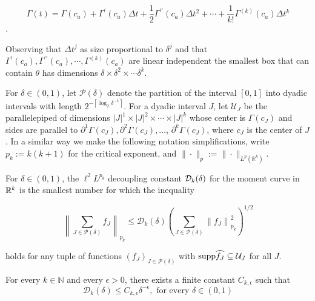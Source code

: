 $$\Gamma(t)=\Gamma\left(c_a\right)+\Gamma^{\prime}\left(c_a\right) \Delta t+\frac{1}{2} \Gamma^{\prime \prime}\left(c_a\right) \Delta t^{2}+\cdots+\frac{1}{k!} \Gamma^{(k)}\left(c_a\right) \Delta t^{k}$$. 

Observing that  $\Delta t^j$ as size proportional to $\delta^j$ and that $\Gamma^{\prime}\left(c_a\right), \Gamma^{\prime \prime}\left(c_a\right), \cdots, \Gamma^{(k)}\left(c_a\right)$ are linear independent the smallest box that can contain $\theta $ has dimensions $\delta \times \delta^2\times \cdots \delta^k$. 

For $\delta \in(0,1)$, let $\mathcal{P}(\delta)$ denote the partition of the interval $[0,1]$ into dyadic intervals with length $2^{-\left\lceil\log _{2} \delta^{-1}\right\rceil}$. For a dyadic interval $J$, let $\mathcal{U}_{J}$ be the parallelepiped of dimensions $|J|^{1} \times|J|^{2} \times \cdots \times|J|^{k}$ whose center is $\Gamma\left(c_{J}\right)$ and sides are parallel to $\partial^{1} \Gamma\left(c_{J}\right), \partial^{2} \Gamma\left(c_{J}\right), \ldots$, $\partial^{k} \Gamma\left(c_{J}\right)$, where $c_{J}$ is the center of $J$. In a similar way we make the following notation simplifications, write $p_{k}:=k(k+1)$ for the critical exponent, and $\|\cdot\|_{p}:=\|\cdot\|_{L^{p}\left(\mathbb{R}^{k}\right)}$.

\begin{defn}\label{defn:gen_moment}
For $\delta \in(0,1)$, the $\ell^{2} L^{p_{k}}$ decoupling constant $\mathcal{D}_{k}(\delta)$ for the moment curve in $\mathbb{R}^k$ is the smallest number for which the inequality

\begin{equation*}
\left\|\sum_{J \in \mathcal{P}(\delta)} f_{J}\right\|_{p_{k}} \leqslant \mathcal{D}_{k}(\delta)\left(\sum_{J \in \mathcal{P}(\delta)}\left\|f_{J}\right\|_{p_{k}}^{2}\right)^{1 / 2} 
\end{equation*}

holds for any tuple of functions $\left(f_{J}\right)_{J \in \mathcal{P}(\delta)}$ with $\text{supp}\widehat{f_{J}} \subseteq \mathcal{U}_{J}$ for all $J$.
\end{defn}
\begin{thm}\label{thm:main_moment}
 For every $k \in \mathbb{N}$ and every $\epsilon>0$, there exists a finite constant $C_{k, \epsilon}$ such that
\begin{equation*}
\mathcal{D}_{k}(\delta) \leqslant C_{k, \epsilon} \delta^{-\epsilon}, \text { for every } \delta \in(0,1)
\end{equation*}
\end{thm}

